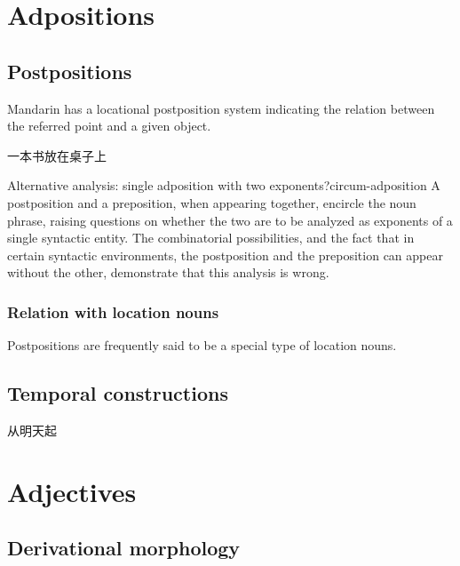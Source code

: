 \documentclass[UTF8, a4paper, oneside, scheme=plain, 12pt]{ctexrep}
\begin{document}
\chapter{Adpositions}\label{chap:adpositions}

\section{Postpositions}\label{sec:adpositions.postpositions}

Mandarin has a locational postposition system indicating
the relation between the referred point and a given object.

\begin{exe}
    \ex 一本书放在桌子上
\end{exe}

\begin{infobox}{Alternative analysis: single adposition with two exponents?}{circum-adposition}
A postposition and a preposition, when appearing together, encircle the noun phrase,
raising questions on whether the two are to be analyzed as 
exponents of a single syntactic entity.
The combinatorial possibilities, and the fact that 
in certain syntactic environments,
the postposition and the preposition can appear without the other,
demonstrate that this analysis is wrong.
\end{infobox}

\subsection{Relation with location nouns}

Postpositions are frequently said to be a special type of location nouns.

\section{Temporal constructions}\label{sec:adpositions.temporal}

从明天起

\chapter{Adjectives}\label{chap:adjectives}

\section{Derivational morphology}\label{sec:adjectives.derivation}
\end{document}
